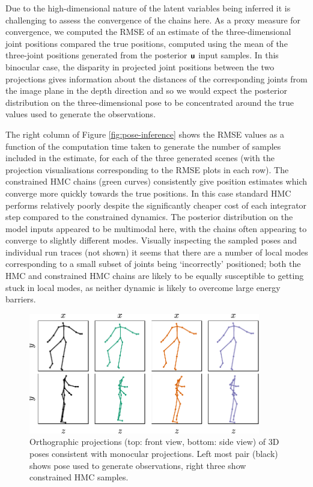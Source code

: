 Due to the high-dimensional nature of the latent variables being inferred it is challenging to assess the convergence of the chains here. As a proxy measure for convergence, we computed the \acf{RMSE} of an estimate of the three-dimensional joint positions compared the true positions, computed using the mean of the three-joint positions generated from the posterior $\boldsymbol{\mathsf{u}}$ input samples. In this binocular case, the disparity in projected joint positions between the two projections gives information about the distances of the corresponding joints from the image plane in the depth direction and so we would expect the posterior distribution on the three-dimensional pose to be concentrated around the true values used to generate the observations.

The right column of Figure \ref{fig:pose-inference} shows the \ac{RMSE} values as a function of the computation time taken to generate the number of samples included in the estimate, for each of the three generated scenes (with the projection visualisations corresponding to the \ac{RMSE} plots in each row). The constrained \ac{HMC} chains (green curves) consistently give position estimates which converge more quickly towards the true positions. In this case standard \ac{HMC} performs relatively poorly despite the significantly cheaper cost of each integrator step compared to the constrained dynamics. The posterior distribution on the model inputs appeared to be multimodal here, with the chains often appearing to converge to slightly different modes. Visually inspecting the sampled poses and individual run traces (not shown) it seems that there are a number of local modes corresponding to a small subset of joints being `incorrectly' positioned; both the \ac{HMC} and constrained \ac{HMC} chains are likely to be equally susceptible to getting stuck in local modes, as neither dynamic is likely to overcome large energy barriers. %

\begin{figure}[t]
\centering
\includegraphics[width=0.9\textwidth]{images/monocular-pose-sample-projections.pdf}
\caption[Monocular observation pose posterior samples.]{Orthographic projections (top: front view, bottom: side view) of 3D poses consistent with monocular projections. Left most pair (black) shows pose used to generate observations, right three show constrained \ac{HMC} samples.}
\label{fig:pose-monocular-samples}
\end{figure}


